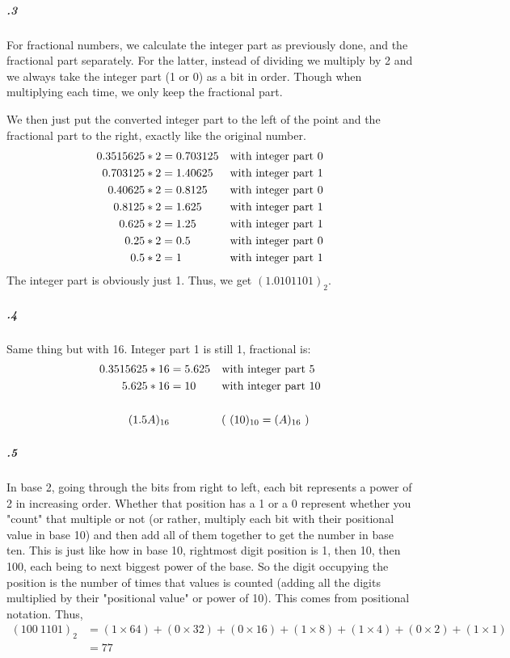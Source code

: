 \documentclass[11pt,letterpaper]{article}
\begin{document}
		\subparagraph{.3}
		For fractional numbers, we calculate the integer part as previously done, and the fractional part separately. For the latter, instead of dividing we multiply by 2 and we always take the integer part (1 or 0) as a bit in order. Though when multiplying each time, we only keep the fractional part.
		
		We then just put the converted integer part to the left of the point and the fractional part to the right, exactly like the original number.
		\begin{align*}
		0.3515625 * 2 &= 0.703125&\textnormal{with integer part 0}\\
		0.703125  * 2 &= 1.40625 &\textnormal{with integer part 1}\\
		0.40625   * 2 &= 0.8125  &\textnormal{with integer part 0}\\
		0.8125    * 2 &= 1.625   &\textnormal{with integer part 1}\\
		0.625     * 2 &= 1.25    &\textnormal{with integer part 1}\\
		0.25      * 2 &= 0.5     &\textnormal{with integer part 0}\\
		0.5       * 2 &= 1       &\textnormal{with integer part 1}\\
		\end{align*}
		The integer part is obviously just 1. Thus, we get $(1.0101101)_2$.
		
		\subparagraph{.4}
		Same thing but with 16. Integer part 1 is still 1, fractional is:
		\begin{align*}
		0.3515625 * 16 &= 5.625&\textnormal{with integer part }&5\\
		5.625     * 16 &= 10   &\textnormal{with integer part }&10\\
		\\
		(1.5A)_{16}&&(\ (10)_{10} = (A)_{16}\ )&\\
		\end{align*}
		
		\subparagraph{.5}
		In base 2, going through the bits from right to left, each bit represents a power of 2 in increasing order. Whether that position has a 1 or a 0 represent whether you "count" that multiple or not (or rather, multiply each bit with their positional value in base 10) and then add all of them together to get the number in base ten. This is just like how in base 10, rightmost digit position is 1, then 10, then 100, each being to next biggest power of the base. So the digit occupying the position is the number of times that values is counted (adding all the digits multiplied by their "positional value" or power of 10). This comes from positional notation.
		Thus,
		\begin{align*}
		(100\ 1101)_2 &= (1 \times 64) + (0 \times 32) + (0 \times 16) + (1 \times 8) + (1 \times 4) + (0 \times 2) + (1 \times 1)\\
		&= 77
		\end{align*}
		
\end{document}
